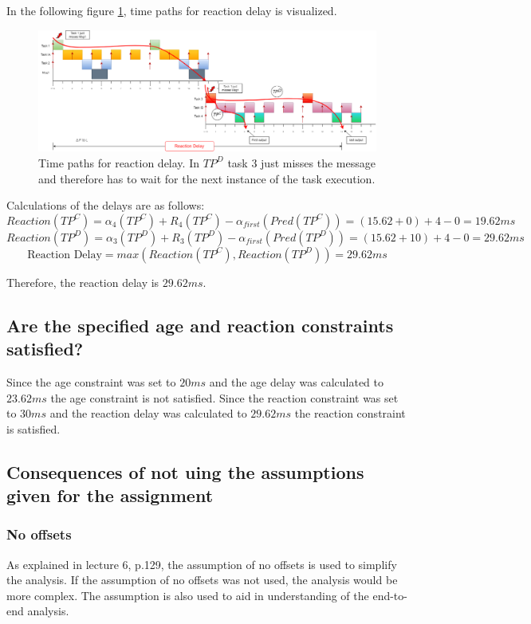             In the following figure \ref{fig:reactiondelaypaths}, time paths for reaction delay is visualized.

            \begin{figure}[H]
                \centering
                \includegraphics[width=1\textwidth]{images/TimedPathReactionDelay.png}
                \caption{Time paths for reaction delay. In $TP^D$ task 3 just misses the message and therefore has to wait for the next instance of the task execution.}
                \label{fig:reactiondelaypaths} 
            \end{figure}

            Calculations of the delays are as follows: 
            $$Reaction(TP^C) = \alpha_4(TP^C) + R_4(TP^C) - \alpha_{first}(Pred(TP^C)) = (15.62+0) + 4 - 0 = 19.62ms$$
            $$Reaction(TP^D) = \alpha_3(TP^D) + R_3(TP^D) - \alpha_{first}(Pred(TP^D)) = (15.62+10) + 4 - 0 = 29.62ms$$
            $$\text{Reaction Delay} = max(Reaction(TP^C), Reaction(TP^D)) = 29.62ms$$

            Therefore, the reaction delay is $29.62ms$.

        \subsection*{\textbf{Are the specified age and reaction constraints satisfied?}}
            Since the age constraint was set to $20ms$ and the age delay was calculated to $23.62ms$ the age constraint is not satisfied. Since the reaction constraint was set to $30ms$ and the reaction delay was calculated to $29.62ms$ the reaction constraint is satisfied.

        \subsection*{\textbf{Consequences of not uing the assumptions given for the assignment}}
            \subsubsection*{No offsets}
                As explained in lecture 6, p.129, the assumption of no offsets is used to simplify the analysis. If the assumption of no offsets was not used, the analysis would be more complex. The assumption is also used to aid in understanding of the end-to-end analysis.

